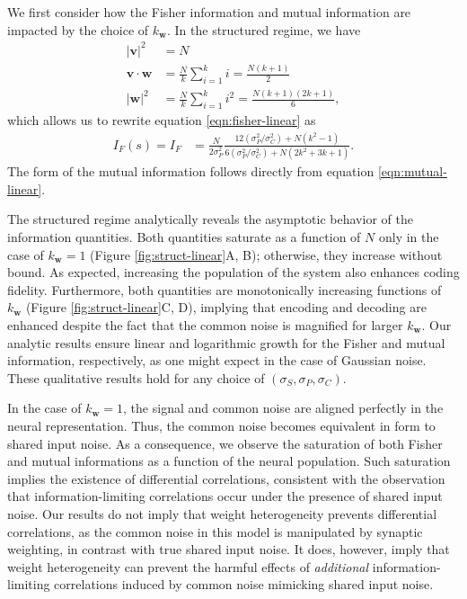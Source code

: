 \documentclass[12pt]{article}
\begin{document}
We first consider how the Fisher information and mutual information are impacted by the choice of $k_{\mathbf{w}}$. In the structured regime, we have 
\begin{align}
	|\mathbf{v}|^2 &= N \\
	\mathbf{v}\cdot\mathbf{w} &= \frac{N}{k} \sum_{i=1}^k i = \frac{N(k+1)}{2} \\
	|\mathbf{w}|^2 &= \frac{N}{k}\sum_{i=1}^k i^2 = \frac{N(k+1)(2k+1)}{6},
\end{align}
which allows us to rewrite equation \ref{eqn:fisher-linear} as
\begin{align}
	I_F(s) = I_F &= \frac{N}{2\sigma_P^2} \frac{12 (\sigma_P^2/\sigma_C^2) + N  (k^2-1)}{6(\sigma_P^2/\sigma_C^2)+ N(2k^2+3k+1)}.
\end{align}
The form of the mutual information follows directly from equation \ref{eqn:mutual-linear}. 
	
The structured regime analytically reveals the asymptotic behavior of the information quantities. Both quantities saturate as a function of $N$  only in the case of $k_{\mathbf{w}}=1$ (Figure \ref{fig:struct-linear}A, B); otherwise, they increase without bound. As expected, increasing the population of the system also enhances coding fidelity. Furthermore, both quantities are monotonically increasing functions of $k_{\mathbf{w}}$ (Figure \ref{fig:struct-linear}C, D), implying that encoding and decoding are enhanced despite the fact that the common noise is magnified for larger $k_{\mathbf{w}}$. Our analytic results ensure linear and logarithmic growth for the Fisher and mutual information, respectively, as one might expect in the case of Gaussian noise. These qualitative results hold for any choice of $(\sigma_S, \sigma_P, \sigma_C)$.
	
In the case of $k_{\mathbf{w}}=1$, the signal and common noise are aligned perfectly in the neural representation. Thus, the common noise becomes equivalent in form to shared input noise. As a consequence, we observe the saturation of both Fisher and mutual informations as a function of the neural population. Such saturation implies the existence of differential correlations, consistent with the observation that information-limiting correlations occur under the presence of shared input noise. Our results do not imply that weight heterogeneity prevents differential correlations, as the common noise in this model is manipulated by synaptic weighting, in contrast with true shared input noise. It does, however, imply that weight heterogeneity can prevent the harmful effects of \textit{additional} information-limiting correlations induced by common noise mimicking shared input noise.
	
\end{document}
